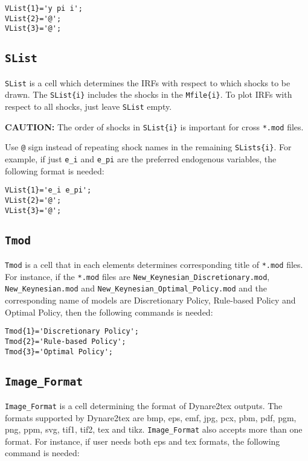 \documentclass[11pt,a4paper]{article}
\begin{document}
\begin{lstlisting} 
VList{1}='y pi i'; 
VList{2}='@';
VList{3}='@';
\end{lstlisting}

\subsection{\texttt{SList}}
\texttt{SList} is a cell which determines the IRFs with respect to which shocks to be drawn. The \texttt{SList\{i\}} includes the shocks in the \texttt{Mfile\{i\}}.  To plot IRFs with respect to all shocks, just leave \texttt{SList} empty.

{\bf CAUTION:} The order of shocks in \texttt{SList\{i\}} is important for cross \texttt{*.mod} files.

Use \texttt{@} sign instead of repeating shock names in the remaining \texttt{SLists\{i\}}. For example, if just \texttt{e\_i} and \texttt{e\_pi} are the preferred 
endogenous variables, the following format is needed:

\begin{lstlisting} 
VList{1}='e_i e_pi'; 
VList{2}='@';
VList{3}='@';
\end{lstlisting}


\subsection{\texttt{Tmod}}
\texttt{Tmod} is a cell that in each elements determines corresponding title of \texttt{*.mod} files. For instance, if the \texttt{*.mod} files are \texttt{New_Keynesian_Discretionary.mod}, \texttt{New_Keynesian.mod} and \texttt{New_Keynesian_Optimal_Policy.mod} and the corresponding name of models are Discretionary Policy, Rule-based Policy and Optimal Policy, then the following commands is needed:
    
\begin{lstlisting} 
Tmod{1}='Discretionary Policy'; 
Tmod{2}='Rule-based Policy';
Tmod{3}='Optimal Policy';
\end{lstlisting}

\subsection{\texttt{Image_Format}}
\texttt{Image_Format} is a cell determining the format of Dynare2tex outputs.
The formats supported by Dynare2tex are bmp, eps, emf, jpg, pcx, pbm, pdf, pgm, png, ppm, svg, tif1, tif2, tex and tikz. \texttt{Image_Format} also accepts more than one format. For instance, if user needs both eps and tex formats, the following command is needed:
\end{document}
